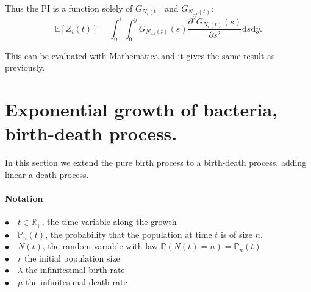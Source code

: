 \documentclass{article}
\newcommand{\ud}{{\mathrm{d}}}
\newcommand{\pr}{{\mathbb{P}}}
\begin{document}
 Thus the PI is a function solely of $G_{N_{i}(t)}$ and $G_{N_{-i}(t)}$:
 \begin{equation}
 \displaystyle \mathbb{E}\left[ Z_i(t) \right]= \int_0^1 \int_0^y G_{N_{-i}(t)}(s) \dfrac{\partial^2 G_{N_i(t)}(s)}{\partial s^2} \ud s \ud y.
 \end{equation}

This can be evaluated with Mathematica and it gives the same result as previously.



\section{Exponential growth of bacteria, birth-death process.}

In this section we extend the pure birth process to a birth-death process, adding linear a death process.
 \paragraph{Notation} $ $\\
 $\bullet \quad t \in \mathbb{R}_+$, the time variable along the growth\\
 $\bullet \quad \pr_n(t)$, the probability that the population at time $t$ is of size $n$.\\
 $\bullet \quad N(t)$, the random variable with law $\pr(N(t)=n)=\pr_n(t)$\\
 $\bullet \quad r$ the initial population size\\
 $\bullet \quad \lambda$ the infinitesimal birth rate\\
 $\bullet \quad \mu$ the infinitesimal death rate\\
 
\end{document}
